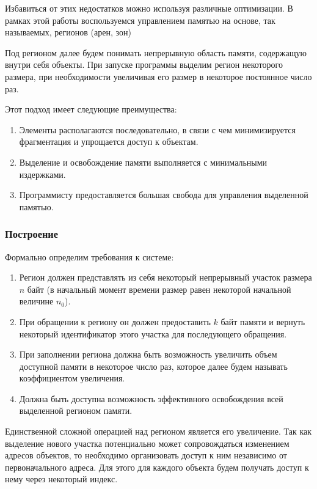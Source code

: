 \documentclass[coursework]{SCWorks}
\begin{document}
Избавиться от этих недостатков можно используя различные оптимизации. В рамках этой работы воспользуемся управлением памятью на основе, так называемых, регионов (арен, зон) \cite{ManageMemory}

Под регионом далее будем понимать непрерывную область памяти, содержащую внутри себя объекты. При запуске программы выделим регион некоторого размера, при необходимости увеличивая его размер в некоторое постоянное число раз.

Этот подход имеет следующие преимущества:

\begin{enumerate}
	\item Элементы располагаются последовательно, в связи с чем минимизируется фрагментация и упрощается доступ к объектам.
	\item Выделение и освобождение памяти выполняется с минимальными издержками.
	\item Программисту предоставляется большая свобода для управления выделенной памятью.
\end{enumerate}

\subsubsection{Построение}

Формально определим требования к системе:

\begin{enumerate}
	\item Регион должен представлять из себя некоторый непрерывный участок размера $n$ байт (в начальный момент времени размер равен некоторой начальной величине $n_0$).
	\item При обращении к региону он должен предоставить $k$ байт памяти и вернуть некоторый идентификатор этого участка для последующего обращения.
	\item При заполнении региона должна быть возможность увеличить объем доступной памяти в некоторое число раз, которое далее будем называть коэффициентом увеличения.
	\item Должна быть доступна возможность эффективного освобождения всей выделенной регионом памяти.
\end{enumerate}

Единственной сложной операцией над регионом является его увеличение. Так как выделение нового участка потенциально может сопровождаться изменением адресов объектов, то необходимо организовать доступ к ним независимо от первоначального адреса. Для этого для каждого объекта будем получать доступ к нему через некоторый индекс.
\end{document}
